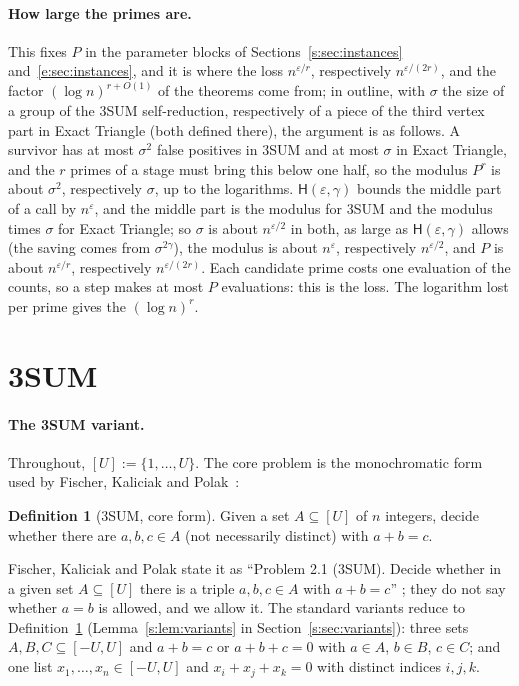 \documentclass[11pt]{article}
\theoremstyle{definition}
\newtheorem{definition}[theorem]{Definition}
\theoremstyle{remark}
\newcommand{\Hyp}{\mathsf{H}}
\begin{document}
\paragraph{How large the primes are.} This fixes $P$ in the parameter blocks of Sections~\ref{s:sec:instances} and~\ref{e:sec:instances}, and it is where the loss $n^{\varepsilon/r}$, respectively $n^{\varepsilon/(2r)}$, and the factor $(\log n)^{r+O(1)}$ of the theorems come from; in outline, with $\sigma$ the size of a group of the 3SUM self-reduction, respectively of a piece of the third vertex part in Exact Triangle (both defined there), the argument is as follows. A survivor has at most $\sigma^2$ false positives in 3SUM and at most $\sigma$ in Exact Triangle, and the $r$ primes of a stage must bring this below one half, so the modulus $P^r$ is about $\sigma^2$, respectively $\sigma$, up to the logarithms. $\Hyp(\varepsilon,\gamma)$ bounds the middle part of a call by $n^\varepsilon$, and the middle part is the modulus for 3SUM and the modulus times $\sigma$ for Exact Triangle; so $\sigma$ is about $n^{\varepsilon/2}$ in both, as large as $\Hyp(\varepsilon,\gamma)$ allows (the saving comes from $\sigma^{2\gamma}$), the modulus is about $n^\varepsilon$, respectively $n^{\varepsilon/2}$, and $P$ is about $n^{\varepsilon/r}$, respectively $n^{\varepsilon/(2r)}$. Each candidate prime costs one evaluation of the counts, so a step makes at most $P$ evaluations: this is the loss. The logarithm lost per prime gives the $(\log n)^r$.

\section{3SUM}\label{s:sec:statement}

\paragraph{The 3SUM variant.} Throughout, $[U]:=\{1,\dots,U\}$. The core problem is the monochromatic form used by Fischer, Kaliciak and Polak~\cite{FKP24}:

\begin{definition}[3SUM, core form]\label{s:def:3sum}
Given a set $A\subseteq[U]$ of $n$ integers, decide whether there are $a,b,c\in A$ (not necessarily distinct) with $a+b=c$.
\end{definition}

Fischer, Kaliciak and Polak state it as ``Problem 2.1 (3SUM). Decide whether in a given set $A\subseteq[U]$ there is a triple $a,b,c\in A$ with $a+b=c$'' \cite[p.~7]{FKP24}; they do not say whether $a=b$ is allowed, and we allow it. The standard variants reduce to Definition~\ref{s:def:3sum} (Lemma~\ref{s:lem:variants} in Section~\ref{s:sec:variants}): three sets $A,B,C\subseteq[-U,U]$ and $a+b=c$ or $a+b+c=0$ with $a\in A$, $b\in B$, $c\in C$; and one list $x_1,\dots,x_n\in[-U,U]$ and $x_i+x_j+x_k=0$ with distinct indices $i,j,k$.
\end{document}
